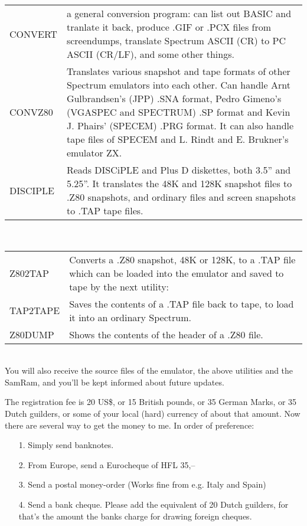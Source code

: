 \begin{tabular}{l@{ -- }p{10cm}}
        CONVERT  & a general conversion program: can list out BASIC and
                   tranlate it back, produce .GIF or .PCX files from
                   screendumps, translate Spectrum ASCII (CR) to PC ASCII
                   (CR/LF), and some other things. \\
        CONVZ80  & Translates various snapshot and tape formats of other
                   Spectrum emulators into each other.  Can handle Arnt
                   Gulbrandsen's (JPP) .SNA format, Pedro Gimeno's
                   (VGASPEC and SPECTRUM) .SP format and Kevin J. Phairs'
                   (SPECEM) .PRG format.  It can also handle tape files
                   of SPECEM and L. Rindt and E. Brukner's emulator ZX\@. \\
        DISCIPLE & Reads DISCiPLE and Plus D diskettes, both 3.5'' and
                   5.25''.  It translates the 48K and 128K snapshot files
                   to .Z80 snapshots, and ordinary files and screen
                   snapshots to .TAP tape files. \\
\end{tabular}\\
\newpage
\begin{tabular}{l@{ -- }p{10cm}}
        Z802TAP  & Converts a .Z80 snapshot, 48K or 128K, to a .TAP file
                   which can be loaded into the emulator and saved to tape
                   by the next utility: \\
        TAP2TAPE & Saves the contents of a .TAP file back to tape, to
                   load it into an ordinary Spectrum. \\
        Z80DUMP  & Shows the contents of the header of a .Z80 file.\\
\end{tabular} \\[.5cm]

\noindent
    You will also receive the source files of the emulator, the above
    utilities and the SamRam, and you'll be kept informed about future
    updates.

    The registration fee is 20 US\$, or 15 British pounds, or 35 German
    Marks, or 35 Dutch guilders, or some of your local (hard) currency of
    about that amount.  Now there are several way to get the money to me. In
    order of preference:

\begin{itemize}
  \item[1.]  Simply send banknotes.
  \item[2.]  From Europe, send a Eurocheque of HFL 35,--
  \item[3.]  Send a postal money-order (Works fine from e.g. Italy and Spain)
  \item[4.]  Send a bank cheque.  Please add the equivalent of 20 Dutch
             guilders, for that's the amount the banks charge for drawing
             foreign cheques.
\end{itemize}

